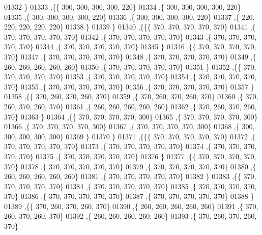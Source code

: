 \begin{DoxyCode}
01332    \}
01333   ,\{\{   300,   300,   300,   300,   220\}
01334    ,\{   300,   300,   300,   300,   220\}
01335    ,\{   300,   300,   300,   300,   220\}
01336    ,\{   300,   300,   300,   300,   220\}
01337    ,\{   220,   220,   220,   220,   220\}
01338    \}
01339   \}
01340  ,\{\{\{   370,   370,   370,   370,   370\}
01341    ,\{   370,   370,   370,   370,   370\}
01342    ,\{   370,   370,   370,   370,   370\}
01343    ,\{   370,   370,   370,   370,   370\}
01344    ,\{   370,   370,   370,   370,   370\}
01345    \}
01346   ,\{\{   370,   370,   370,   370,   370\}
01347    ,\{   370,   370,   370,   370,   370\}
01348    ,\{   370,   370,   370,   370,   370\}
01349    ,\{   260,   260,   260,   260,   260\}
01350    ,\{   370,   370,   370,   370,   370\}
01351    \}
01352   ,\{\{   370,   370,   370,   370,   370\}
01353    ,\{   370,   370,   370,   370,   370\}
01354    ,\{   370,   370,   370,   370,   370\}
01355    ,\{   370,   370,   370,   370,   370\}
01356    ,\{   370,   370,   370,   370,   370\}
01357    \}
01358   ,\{\{   370,   260,   370,   260,   370\}
01359    ,\{   370,   260,   370,   260,   370\}
01360    ,\{   370,   260,   370,   260,   370\}
01361    ,\{   260,   260,   260,   260,   260\}
01362    ,\{   370,   260,   370,   260,   370\}
01363    \}
01364   ,\{\{   370,   370,   370,   370,   300\}
01365    ,\{   370,   370,   370,   370,   300\}
01366    ,\{   370,   370,   370,   370,   300\}
01367    ,\{   370,   370,   370,   370,   300\}
01368    ,\{   300,   300,   300,   300,   300\}
01369    \}
01370   \}
01371  ,\{\{\{   370,   370,   370,   370,   370\}
01372    ,\{   370,   370,   370,   370,   370\}
01373    ,\{   370,   370,   370,   370,   370\}
01374    ,\{   370,   370,   370,   370,   370\}
01375    ,\{   370,   370,   370,   370,   370\}
01376    \}
01377   ,\{\{   370,   370,   370,   370,   370\}
01378    ,\{   370,   370,   370,   370,   370\}
01379    ,\{   370,   370,   370,   370,   370\}
01380    ,\{   260,   260,   260,   260,   260\}
01381    ,\{   370,   370,   370,   370,   370\}
01382    \}
01383   ,\{\{   370,   370,   370,   370,   370\}
01384    ,\{   370,   370,   370,   370,   370\}
01385    ,\{   370,   370,   370,   370,   370\}
01386    ,\{   370,   370,   370,   370,   370\}
01387    ,\{   370,   370,   370,   370,   370\}
01388    \}
01389   ,\{\{   370,   260,   370,   260,   370\}
01390    ,\{   260,   260,   260,   260,   260\}
01391    ,\{   370,   260,   370,   260,   370\}
01392    ,\{   260,   260,   260,   260,   260\}
01393    ,\{   370,   260,   370,   260,   370\}

\end{DoxyCode}
